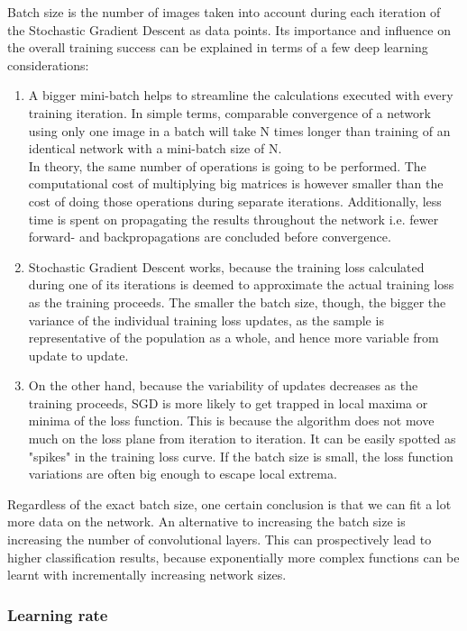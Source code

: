 \documentclass[a4paper, 12pt]{article}
\numberwithin{equation}{section}
\begin{document}
	Batch size is the number of images taken into account during each iteration of the Stochastic Gradient Descent as data points. Its importance and influence on the overall training success can be explained in terms of a few deep learning considerations:
	\begin{enumerate}
		\item A bigger mini-batch helps to streamline the calculations executed with every training iteration. In simple terms, comparable convergence of a network using only one image in a batch will take N times longer than training of an identical network with a mini-batch size of N. \\ In theory, the same number of operations is going to be performed. The computational cost of multiplying big matrices is however smaller than the cost of doing those operations during separate iterations. Additionally, less time is spent on propagating the results throughout the network i.e. fewer forward- and backpropagations are concluded before convergence.
		\item Stochastic Gradient Descent works, because the training loss calculated during one of its iterations is deemed to approximate the actual training loss as the training proceeds. The smaller the batch size, though, the bigger the variance of the individual training loss updates, as the sample is representative of the population as a whole, and hence more variable from update to update.
		\item On the other hand, because the variability of updates decreases as the training proceeds, SGD is more likely to get trapped in local maxima or minima of the loss function. This is because the algorithm does not move much on the loss plane from iteration to iteration. It can be easily spotted as "spikes" in the training loss curve. If the batch size is small, the loss function variations are often big enough to escape local extrema.
	\end{enumerate}

	Regardless of the exact batch size, one certain conclusion is that we can fit a lot more data on the network. An alternative to increasing the batch size is increasing the number of convolutional layers. This can prospectively lead to higher classification results, because exponentially more complex functions can be learnt with incrementally increasing network sizes.

	\subsubsection{Learning rate}
\end{document}
